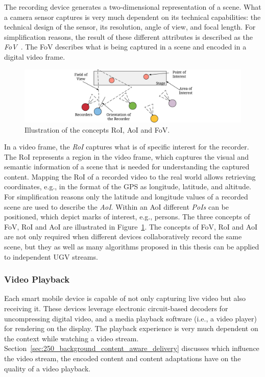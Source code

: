 The recording device generates a two-dimensional representation of a scene.
What a camera sensor captures is very much dependent on its technical capabilities: the technical design of the sensor, its resolution, angle of view, and focal length.
For simplification reasons, the result of these different attributes is described as the \emph{\ac{FoV}}~\cite{Ay2008}.
The \ac{FoV} describes what is being captured in a scene and encoded in a digital video frame.

\begin{figure}[tbh]
\centering
\includegraphics[width=\linewidth]{gfx/200_Background/RelatedWork_ROI}
\caption{Illustration of the concepts RoI, AoI and FoV.}
\label{fig:205_relatedworkroi}
\end{figure}
In a video frame, the \emph{\ac{RoI}} captures what is of specific interest for the recorder.
The \ac{RoI} represents a region in the video frame, which captures the visual and semantic information of a scene that is needed for understanding the captured content.
Mapping the \ac{RoI} of a recorded video to the real world allows retrieving coordinates, e.g., in the format of the \ac{GPS} as longitude, latitude, and altitude.
For simplification reasons only the latitude and longitude values of a recorded scene are used to describe the \emph{\ac{AoI}}. 
Within an \ac{AoI} different \emph{\acfp{PoI}} can be positioned, which depict marks of interest, e.g., persons.
The three concepts of \ac{FoV}, \ac{RoI} and \ac{AoI} are illustrated in Figure~\ref{fig:205_relatedworkroi}.
The concepts of  \ac{FoV}, \ac{RoI} and \ac{AoI} are not only required when different devices collaboratively record the same scene, but they as well as many algorithms proposed in this thesis can be applied to independent \ac{UGV} streams.
\subsubsection{Video Playback}
Each smart mobile device is capable of not only capturing live video but also receiving it.
These devices leverage electronic circuit-based decoders for uncompressing digital video, and a media playback software (i.e., a video player) for rendering on the display.
The playback experience is very much dependent on the context while watching a video stream.
Section~\ref{sec:250_background_content_aware_delivery} discusses which influence the video stream, the encoded content and content adaptations have on the quality of a video playback.

